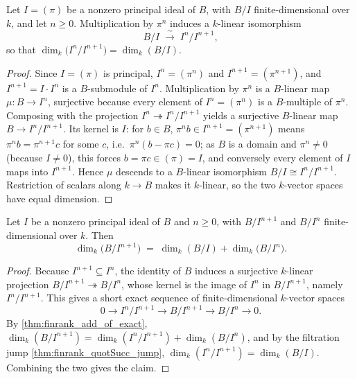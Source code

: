 \begin{theorem}
  \label{thm:finrank_quotSucc_jump}
  \leanok
  Let \(I = (\pi)\) be a nonzero principal ideal of \(B\), with \(B/I\) finite-dimensional over
  \(k\), and let \(n \ge 0\). Multiplication by \(\pi^n\) induces a \(k\)-linear isomorphism
  \[
    B/I \;\xrightarrow{\ \sim\ }\; I^n / I^{n+1} ,
  \]
  so that \(\dim_k\bigl(I^n / I^{n+1}\bigr) = \dim_k(B/I)\).
\end{theorem}
\begin{proof}
  \leanok
  Since \(I = (\pi)\) is principal, \(I^n = (\pi^n)\) and \(I^{n+1} = (\pi^{n+1})\), and
  \(I^{n+1} = I \cdot I^n\) is a \(B\)-submodule of \(I^n\). Multiplication by \(\pi^n\) is a
  \(B\)-linear map \(\mu : B \to I^n\), surjective because every element of \(I^n = (\pi^n)\)
  is a \(B\)-multiple of \(\pi^n\). Composing with the projection \(I^n \twoheadrightarrow
  I^n/I^{n+1}\) yields a surjective \(B\)-linear map \(B \to I^n/I^{n+1}\). Its kernel is
  \(I\): for \(b \in B\), \(\pi^n b \in I^{n+1} = (\pi^{n+1})\) means \(\pi^n b = \pi^{n+1} c\)
  for some \(c\), i.e.\ \(\pi^n(b - \pi c) = 0\); as \(B\) is a domain and \(\pi^n \neq 0\)
  (because \(I \neq 0\)), this forces \(b = \pi c \in (\pi) = I\), and conversely every element
  of \(I\) maps into \(I^{n+1}\). Hence \(\mu\) descends to a \(B\)-linear isomorphism
  \(B/I \cong I^n/I^{n+1}\). Restriction of scalars along \(k \to B\) makes it \(k\)-linear,
  so the two \(k\)-vector spaces have equal dimension.
\end{proof}

\begin{theorem}
  \label{thm:finrank_quotient_pow_succ}
  \leanok
  Let \(I\) be a nonzero principal ideal of \(B\) and \(n \ge 0\), with \(B/I^{n+1}\) and
  \(B/I^n\) finite-dimensional over \(k\). Then
  \[
    \dim_k\bigl(B/I^{n+1}\bigr) \;=\; \dim_k(B/I) + \dim_k\bigl(B/I^n\bigr) .
  \]
\end{theorem}
\begin{proof}
  \leanok
  Because \(I^{n+1} \subseteq I^n\), the identity of \(B\) induces a surjective \(k\)-linear
  projection \(B/I^{n+1} \twoheadrightarrow B/I^n\), whose kernel is the image of \(I^n\) in
  \(B/I^{n+1}\), namely \(I^n/I^{n+1}\). This gives a short exact sequence of
  finite-dimensional \(k\)-vector spaces
  \[
    0 \longrightarrow I^n/I^{n+1} \longrightarrow B/I^{n+1} \longrightarrow B/I^n
      \longrightarrow 0 .
  \]
  By \ref{thm:finrank_add_of_exact}, \(\dim_k(B/I^{n+1}) = \dim_k(I^n/I^{n+1}) +
  \dim_k(B/I^n)\), and by the filtration jump \ref{thm:finrank_quotSucc_jump},
  \(\dim_k(I^n/I^{n+1}) = \dim_k(B/I)\). Combining the two gives the claim.
\end{proof}

